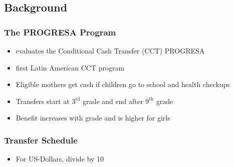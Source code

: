 \documentclass[11pt]{beamer}
\begin{document}
\subsection{Background}

\begin{frame}[c]\frametitle{The PROGRESA Program}
    \begin{itemize}
        \item \cite{Todd2006} evaluates the Conditional Cash Transfer (CCT) PROGRESA
        \item first Latin American CCT program
        \item Eligible mothers get cash if children go to school and health checkups
        \item Transfers start at $3^\text{rd}$ grade and end after $9^\text{th}$ grade
        \item Benefit increases with grade and is higher for girls
    \end{itemize}
\end{frame}



\begin{frame}[c]\frametitle{Transfer Schedule}
\vspace{-0.5cm}
\vspace{1cm}

\begin{itemize}
    \item For US-Dollars, divide by 10
\end{itemize}
\end{frame}
\end{document}

